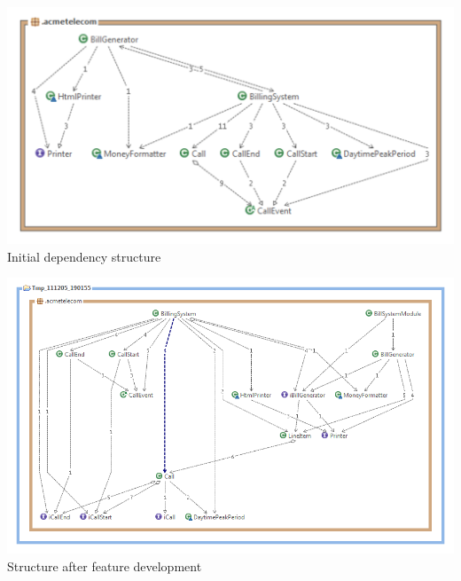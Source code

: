 \documentclass[pdftex,11pt,a4paper]{article}
\begin{document}
\begin{center}
	\includegraphics[scale=0.7]{images/Acme_Telecom_Structure.pdf}
Initial dependency structure
\end{center}

\begin{center}
	\includegraphics[scale=0.45]{images/AcmeTelecom_Software_Structure_After_Refactoring.png}\\
Structure after feature development
\end{center}
\end{document}
